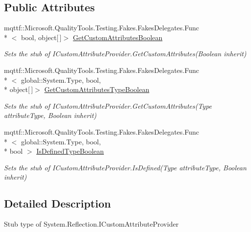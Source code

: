 \subsection*{Public Attributes}
\begin{DoxyCompactItemize}
\item 
mqttf\-::\-Microsoft.\-Quality\-Tools.\-Testing.\-Fakes.\-Fakes\-Delegates.\-Func\\*
$<$ bool, object\mbox{[}$\,$\mbox{]}$>$ \hyperlink{class_system_1_1_reflection_1_1_fakes_1_1_stub_i_custom_attribute_provider_a1dd357571277a3d29e61c866fca4ed16}{Get\-Custom\-Attributes\-Boolean}
\begin{DoxyCompactList}\small\item\em Sets the stub of I\-Custom\-Attribute\-Provider.\-Get\-Custom\-Attributes(\-Boolean inherit)\end{DoxyCompactList}\item 
mqttf\-::\-Microsoft.\-Quality\-Tools.\-Testing.\-Fakes.\-Fakes\-Delegates.\-Func\\*
$<$ global\-::\-System.\-Type, bool, \\*
object\mbox{[}$\,$\mbox{]}$>$ \hyperlink{class_system_1_1_reflection_1_1_fakes_1_1_stub_i_custom_attribute_provider_ab95aa53c660232205b4324be2cf8b53f}{Get\-Custom\-Attributes\-Type\-Boolean}
\begin{DoxyCompactList}\small\item\em Sets the stub of I\-Custom\-Attribute\-Provider.\-Get\-Custom\-Attributes(\-Type attribute\-Type, Boolean inherit)\end{DoxyCompactList}\item 
mqttf\-::\-Microsoft.\-Quality\-Tools.\-Testing.\-Fakes.\-Fakes\-Delegates.\-Func\\*
$<$ global\-::\-System.\-Type, bool, \\*
bool $>$ \hyperlink{class_system_1_1_reflection_1_1_fakes_1_1_stub_i_custom_attribute_provider_a1db8ad33b7aa2b98abc3f4dd37ba9dc5}{Is\-Defined\-Type\-Boolean}
\begin{DoxyCompactList}\small\item\em Sets the stub of I\-Custom\-Attribute\-Provider.\-Is\-Defined(\-Type attribute\-Type, Boolean inherit)\end{DoxyCompactList}\end{DoxyCompactItemize}


\subsection{Detailed Description}
Stub type of System.\-Reflection.\-I\-Custom\-Attribute\-Provider



